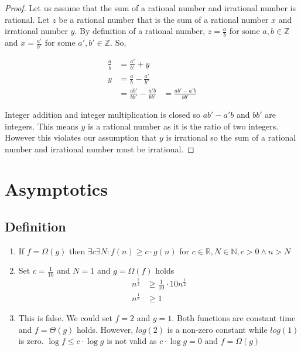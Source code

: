 \documentclass{article}
\begin{document}
\begin{proof}
Let us assume that the sum of a rational number and irrational number is rational.
Let \( z \) be a rational number that is the sum of a rational number \( x\) and irrational number \( y\).
By definition of a rational number, \(z = \frac{a}{b}\) for some \(a,b \in \mathbb{Z}\)
and \(x=\frac{a'}{b'}\) for some \(a',b'\in \mathbb{Z}\). So,

\begin{align*}
        \frac{a}{b} &= \frac{a'}{b'} + y \\
        y &= \frac{a}{b} - \frac{a'}{b'} \\
        &= \frac{ab'}{bb'} - \frac{a'b}{bb'}
        &= \frac{ab'-a'b}{bb'}
\end{align*}

Integer addition and integer multiplication is closed so \(ab'-a'b\) and \(bb'\) are integers. This means \(y\) is a rational number as it is the ratio of two integers. However this violates our assumption that \(y\) is irrational so the sum of a rational number and irrational number must be irrational.

\end{proof}

\newpage

\section{Asymptotics}
\subsection{Definition}

\begin{enumerate}[label=(\alph*)]
    \item If \(f = \Omega (g)\) then \(\exists c\exists N: f(n) \geq c \cdot g(n)\) for \(c \in \mathbb{R}, N \in \mathbb{N}, c > 0 \land n > N\)
    
    \item Set \(c = \frac{1}{10}\) and \(N = 1\) and \(g = \Omega (f)\) holds
        \begin{align*}
            n^{{\frac{2}{3}}} &\geq \frac{1}{10} \cdot 10n^{\frac{1}{2}} \\
            n^{\frac{1}{6}} &\geq 1
        \end{align*}
        
    \item This is false. We could set \(f = 2\) and \(g = 1\). Both functions are constant time and \(f = \Theta(g)\) holds. However, \(log(2)\) is a non-zero constant while \(log(1)\) is zero. \(\log f \leq c\cdot \log g\) is not valid as \(c\cdot \log g = 0\) and \(f = \Omega(g)\)
\end{enumerate}
\end{document}
